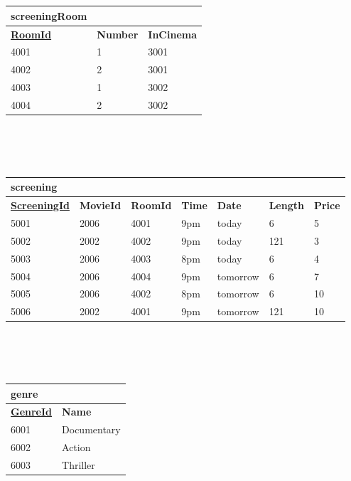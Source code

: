 \documentclass[a4paper]{article}
\begin{document}
\\
\\
\begin{tabular}{|l|l|l|}
\hline
\textbf{screeningRoom} & &\\
\hline
\textbf{\uline{RoomId}} & \textbf{Number} & \textbf{InCinema}\\
\hline
4001 & 1 & 3001\\
\hline
4002 & 2 & 3001\\
\hline
4003 & 1 & 3002\\
\hline
4004 & 2 & 3002\\
\hline

\end{tabular}\\
\\
\\
\begin{tabular}{|l|l|l|l|l|l|l|}
\hline
\textbf{screening} & & & & & & \\
\hline
\textbf{\uline{ScreeningId}} & \textbf{MovieId} & \textbf{RoomId} & \textbf{Time} & \textbf{Date} & \textbf{Length} & \textbf{Price} \\
\hline
5001 & 2006 & 4001 & 9pm & today & 6 & 5\\
\hline
5002 & 2002 & 4002 & 9pm & today & 121 & 3\\
\hline
5003 & 2006 & 4003 & 8pm & today & 6 & 4\\
\hline
5004 & 2006 & 4004 & 9pm & tomorrow & 6 & 7\\
\hline
5005 & 2006 & 4002 & 8pm & tomorrow & 6 & 10\\
\hline
5006 & 2002 & 4001 & 9pm & tomorrow & 121 & 10\\
\hline

\end{tabular}\\
\\
\\
\begin{tabular}{|l|l|}
\hline
\textbf{genre} &\\
\hline
\textbf{\uline{GenreId}} & \textbf{Name}\\
\hline
6001 & Documentary \\
\hline
6002 & Action \\
\hline
6003 & Thriller \\
\hline

\end{tabular}\\
\\
\\
\end{document}
